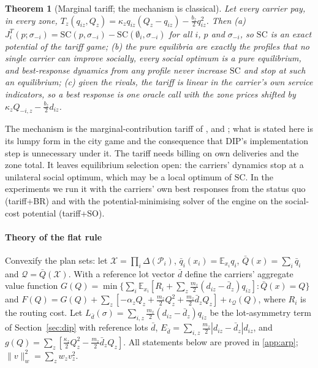 \documentclass[preprint,12pt]{elsarticle}
\newtheorem{theorem}{Theorem}
\theoremstyle{definition}
\theoremstyle{remark}
\newcommand{\E}{\mathbb{E}}
\newcommand{\cP}{\mathcal{P}}
\newcommand{\cQ}{\mathcal{Q}}
\newcommand{\cX}{\mathcal{X}}
\begin{document}
\begin{theorem}[Marginal tariff; the mechanism is classical]\label{thm:mct}
Let every carrier pay, in every zone, $T_z(q_{iz},Q_z)=\kappa_zq_{iz}(Q_z-q_{iz})-\tfrac{b_z}{2}q_{iz}^2$. Then (a) $J^T_i(p;\sigma_{-i})=\mathrm{SC}(p,\sigma_{-i})-\mathrm{SC}(\emptyset_i,\sigma_{-i})$ for all $i$, $p$ and $\sigma_{-i}$, so $\mathrm{SC}$ is an exact potential of the tariff game; (b) the pure equilibria are exactly the profiles that no single carrier can improve socially, every social optimum is a pure equilibrium, and best-response dynamics from any profile never increase $\mathrm{SC}$ and stop at such an equilibrium; (c) given the rivals, the tariff is linear in the carrier's own service indicators, so a best response is one oracle call with the zone prices shifted by $\kappa_zQ_{-i,z}-\tfrac{b_z}{2}d_{iz}$.
\end{theorem}
The mechanism is the marginal-contribution tariff of \citet{Wolpert2001}, \citet{Sandholm2002} and \citet{Marden2013}; what is stated here is its lumpy form in the city game and the consequence that DIP's implementation step is unnecessary under it. The tariff needs billing on own deliveries and the zone total. It leaves equilibrium selection open: the carriers' dynamics stop at a unilateral social optimum, which may be a local optimum of $\mathrm{SC}$. In the experiments we run it with the carriers' own best responses from the status quo (tariff+BR) and with the potential-minimising solver of the engine on the social-cost potential (tariff+SO).

\paragraph{Theory of the flat rule} Convexify the plan sets: let $\cX=\prod_i\Delta(\cP_i)$, $\bar q_i(x_i)=\E_{x_i}q_i$, $\bar Q(x)=\sum_i\bar q_i$ and $\cQ=\bar Q(\cX)$. With a reference lot vector $\bar d$ define the carriers' aggregate value function $G(Q)=\min\{\sum_i\E_{x_i}[R_i+\sum_z\tfrac{m_z}{2}(d_{iz}-\bar d_z)q_{iz}]:\bar Q(x)=Q\}$ and $F(Q)=G(Q)+\sum_z[-\alpha_zQ_z+\tfrac{m_z}{2}Q_z^2+\tfrac{m_z}{2}\bar d_zQ_z]+\iota_{\cQ}(Q)$, where $R_i$ is the routing cost. Let $L_{\bar d}(\sigma)=\sum_{i,z}\tfrac{m_z}{2}(d_{iz}-\bar d_z)q_{iz}$ be the lot-asymmetry term of Section~\ref{sec:dip} with reference lots $\bar d$, $E_{\bar d}=\sum_{i,z}\tfrac{m_z}{2}|d_{iz}-\bar d_z|d_{iz}$, and $g(Q)=\sum_z[\tfrac{\kappa_z}{2}Q_z^2-\tfrac{m_z}{2}\bar d_zQ_z]$. All statements below are proved in \ref{app:arp}; $\|v\|_w^2=\sum_zw_zv_z^2$.
\end{document}
